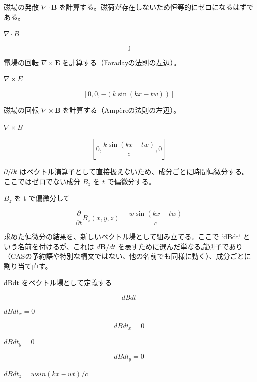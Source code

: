 \documentclass[dvipdfmx,a4paper,11pt]{jsarticle}
\begin{document}
磁場の発散 $\nabla\cdot\mathbf B$ を計算する。磁荷が存在しないため恒等的にゼロになるはずである。

$\nabla \cdot B$

\begin{equation}
  0
  \label{eq:E8}
\end{equation}

電場の回転 $\nabla\times\mathbf E$ を計算する（Faradayの法則の左辺）。

$\nabla \times E$

\begin{equation}
  \left[ 0 , 0 , -\left(k \sin \left(k x-t w\right)\right) \right]
  \label{eq:E9}
\end{equation}

磁場の回転 $\nabla\times\mathbf B$ を計算する（Ampèreの法則の左辺）。

$\nabla \times B$

\begin{equation}
  \left[ 0 , \frac{k \sin \left(k x-t w\right)}{c} , 0 \right]
  \label{eq:E10}
\end{equation}

$\partial/\partial t$ はベクトル演算子として直接扱えないため、成分ごとに時間偏微分する。ここではゼロでない成分 $B_z$ を $t$ で偏微分する。

$B_z$ を t で偏微分して

\begin{equation}
  \frac{\partial}{\partial t} B_z(x,y,z) = \frac{w \sin \left(k x-t w\right)}{c}
  \label{eq:E11}
\end{equation}

求めた偏微分の結果を、新しいベクトル場として組み立てる。ここで `dBdt` という名前を付けるが、これは $d\mathbf B/dt$ を表すために選んだ単なる識別子であり（CASの予約語や特別な構文ではない、他の名前でも同様に動く）、成分ごとに割り当て直す。

dBdt をベクトル場として定義する

\[
  dBdt
\]

$dBdt_x = 0$

\begin{equation}
  dBdt_x = 0
  \label{eq:E12}
\end{equation}

$dBdt_y = 0$

\begin{equation}
  dBdt_y = 0
  \label{eq:E13}
\end{equation}

$dBdt_z = w sin(k x - w t)/c$
\end{document}
